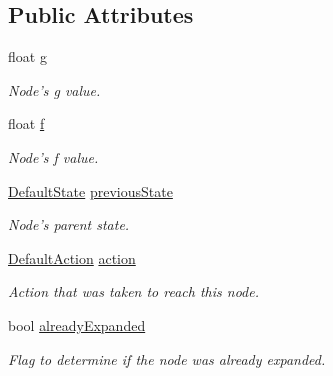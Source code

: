 \subsection*{Public Attributes}
\begin{DoxyCompactItemize}
\item 
\hypertarget{class_best_first_search_node_ad6c65af451d6e2904c842833d49876c8}{float \hyperlink{class_best_first_search_node_ad6c65af451d6e2904c842833d49876c8}{g}}\label{class_best_first_search_node_ad6c65af451d6e2904c842833d49876c8}

\begin{DoxyCompactList}\small\item\em Node's g value. \end{DoxyCompactList}\item 
\hypertarget{class_best_first_search_node_a586a71b36b6621e0290f903c5b97adfd}{float \hyperlink{class_best_first_search_node_a586a71b36b6621e0290f903c5b97adfd}{f}}\label{class_best_first_search_node_a586a71b36b6621e0290f903c5b97adfd}

\begin{DoxyCompactList}\small\item\em Node's f value. \end{DoxyCompactList}\item 
\hypertarget{class_best_first_search_node_a9019b1e6f7cb4783ffb318cd58f726f4}{\hyperlink{class_default_state}{Default\-State} \hyperlink{class_best_first_search_node_a9019b1e6f7cb4783ffb318cd58f726f4}{previous\-State}}\label{class_best_first_search_node_a9019b1e6f7cb4783ffb318cd58f726f4}

\begin{DoxyCompactList}\small\item\em Node's parent state. \end{DoxyCompactList}\item 
\hypertarget{class_best_first_search_node_a8ec9adf5c8c0345a67f99e552da8e4e8}{\hyperlink{class_default_action}{Default\-Action} \hyperlink{class_best_first_search_node_a8ec9adf5c8c0345a67f99e552da8e4e8}{action}}\label{class_best_first_search_node_a8ec9adf5c8c0345a67f99e552da8e4e8}

\begin{DoxyCompactList}\small\item\em Action that was taken to reach this node. \end{DoxyCompactList}\item 
\hypertarget{class_best_first_search_node_a27b1fe54e186d21b8cabf78c87cabe02}{bool \hyperlink{class_best_first_search_node_a27b1fe54e186d21b8cabf78c87cabe02}{already\-Expanded}}\label{class_best_first_search_node_a27b1fe54e186d21b8cabf78c87cabe02}

\begin{DoxyCompactList}\small\item\em Flag to determine if the node was already expanded. \end{DoxyCompactList}\end{DoxyCompactItemize}


